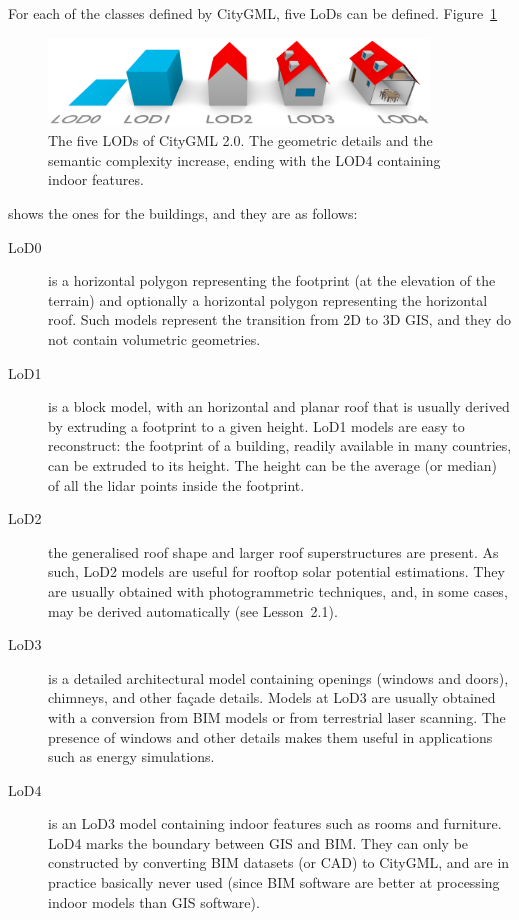 For each of the classes defined by CityGML, five LoDs can be defined.
Figure~\ref{fig:officiallods}
\begin{figure}[h]
  \centering
  \includegraphics[width=0.9\textwidth]{figs/CityGML-LODs-c3.png}
  \caption{The five LODs of CityGML 2.0. The geometric details and the semantic complexity increase, ending with the LOD4 containing indoor features.}
\label{fig:officiallods}
\end{figure}
shows the ones for the buildings, and they are as follows:
\begin{description}
  \item[LoD0] is a horizontal polygon representing the footprint (at the elevation of the terrain) and optionally a horizontal polygon representing the horizontal roof.
  Such models represent the transition from 2D to 3D GIS, and they do not contain volumetric geometries.
  \item[LoD1] is a block model, with an horizontal and planar roof that is usually derived by extruding a footprint to a given height.
  LoD1 models are easy to reconstruct: the footprint of a building, readily available in many countries, can be extruded to its height. The height can be the average (or median) of all the lidar points inside the footprint.
  \item[LoD2] the generalised roof shape and larger roof superstructures are present.
  As such, LoD2 models are useful for rooftop solar potential estimations.
  They are usually obtained with photogrammetric techniques, and, in some cases, may be derived automatically (see Lesson~2.1). 
  \item[LoD3] is a detailed architectural model containing openings (windows and doors), chimneys, and other façade details.
  Models at LoD3 are usually obtained with a conversion from BIM models or from terrestrial laser scanning.
  The presence of windows and other details makes them useful in applications such as energy simulations.
  \item[LoD4] is an LoD3 model containing indoor features such as rooms and furniture.
  LoD4 marks the boundary between GIS and BIM\@.
  They can only be constructed by converting BIM datasets (or CAD) to CityGML, and are in practice basically never used (since BIM software are better at processing indoor models than GIS software).
\end{description}

